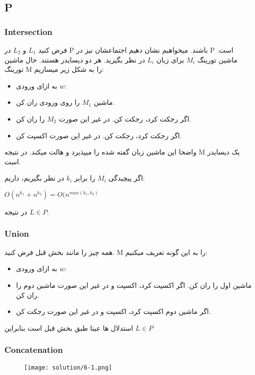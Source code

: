 \subsection*{P}

\subsubsection*{Intersection}
فرض کنید $L_1$ و $L_2$ در P باشند.
میخواهیم نشان دهیم اجتماعشان نیز در P است.
ماشین تورینگ $M_i$ برای زبان $L_i$ در نظر بگیرید. هر دو دیسایدر هستند.
حال ماشین تورینگ M را به شکل زیر میسازیم:
\begin{itemize}
    \item به ازای ورودی $w$:
    \item ماشین $M_1$ را روی ورودی ران کن.
    \item اگر رجکت کرد، رجکت کن. در غیر این صورت $M_2$ را ران کن.
    \item اگر رجکت کرد، رجکت کن. در غیر این صورت اکسپت کن.
\end{itemize}
واضحا این ماشین زبان گفته شده را میپذیرد و هالت میکند.
در نتیجه M یک دیسایدر است. 

اگر پیچیدگی $M_i$ را برابر $k_i$ در نظر بگیریم، داریم:
\begin{center}
    $O(n^{k_1} + n^{k_2}) = O(n^{max(k_1, k_2)}$
\end{center}
در نتیجه 
$L \in P$.


\subsubsection*{Union}
همه چیز را مانند بخش قبل فرض کنید. M را به این گونه تعریف میکنیم:
\begin{itemize}
    \item به ازای ورودی $w$:
    \item ماشین اول را ران کن. اگر اکسپت کرد، اکسپت و در غیر این صورت ماشین دوم را ران کن.
    \item اگر ماشین دوم اکسپت کرد، اکسپت و در غیر این صورت رجکت کن.
\end{itemize}
استدلال ها عینا طبق بخش قبل است بنابراین 
$L \in P$

\subsubsection*{Concatenation}
\begin{figure}[H]
    \centering
    \texttt{[image: solution/6-1.png]}
\end{figure}

